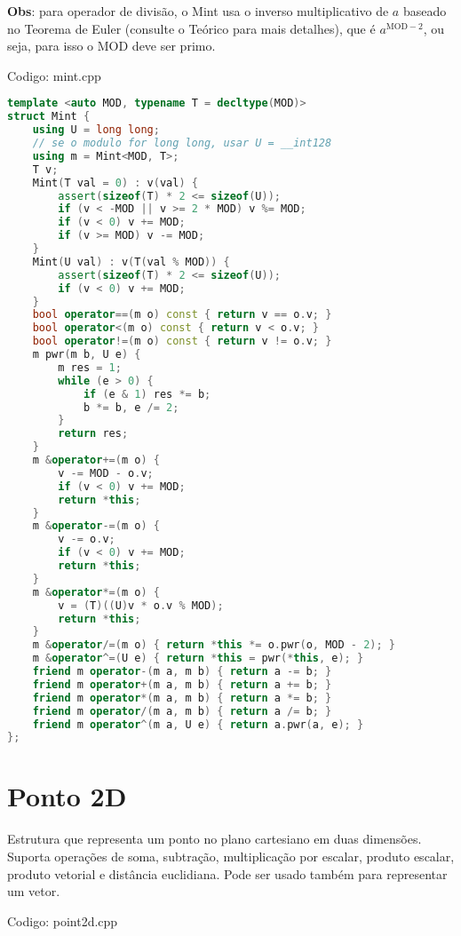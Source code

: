 \documentclass[10pt, a4paper, oneside]{book}
\begin{document}
\textbf{Obs}: para operador de divisão, o Mint usa o inverso multiplicativo de $a$ baseado no Teorema de Euler (consulte o Teórico para mais detalhes), que é $a^{\text{MOD}-2}$, ou seja, para isso o $\text{MOD}$ deve ser primo.

\hfill

Codigo: mint.cpp

\begin{lstlisting}[language=C++]
template <auto MOD, typename T = decltype(MOD)>
struct Mint {
    using U = long long;
    // se o modulo for long long, usar U = __int128
    using m = Mint<MOD, T>;
    T v;
    Mint(T val = 0) : v(val) {
        assert(sizeof(T) * 2 <= sizeof(U));
        if (v < -MOD || v >= 2 * MOD) v %= MOD;
        if (v < 0) v += MOD;
        if (v >= MOD) v -= MOD;
    }
    Mint(U val) : v(T(val % MOD)) {
        assert(sizeof(T) * 2 <= sizeof(U));
        if (v < 0) v += MOD;
    }
    bool operator==(m o) const { return v == o.v; }
    bool operator<(m o) const { return v < o.v; }
    bool operator!=(m o) const { return v != o.v; }
    m pwr(m b, U e) {
        m res = 1;
        while (e > 0) {
            if (e & 1) res *= b;
            b *= b, e /= 2;
        }
        return res;
    }
    m &operator+=(m o) {
        v -= MOD - o.v;
        if (v < 0) v += MOD;
        return *this;
    }
    m &operator-=(m o) {
        v -= o.v;
        if (v < 0) v += MOD;
        return *this;
    }
    m &operator*=(m o) {
        v = (T)((U)v * o.v % MOD);
        return *this;
    }
    m &operator/=(m o) { return *this *= o.pwr(o, MOD - 2); }
    m &operator^=(U e) { return *this = pwr(*this, e); }
    friend m operator-(m a, m b) { return a -= b; }
    friend m operator+(m a, m b) { return a += b; }
    friend m operator*(m a, m b) { return a *= b; }
    friend m operator/(m a, m b) { return a /= b; }
    friend m operator^(m a, U e) { return a.pwr(a, e); }
};
\end{lstlisting}
\hfill

\section{Ponto 2D}


Estrutura que representa um ponto no plano cartesiano em duas dimensões. Suporta operações de soma, subtração, multiplicação por escalar, produto escalar, produto vetorial e distância euclidiana. Pode ser usado também para representar um vetor.

\hfill

Codigo: point2d.cpp
\end{document}
